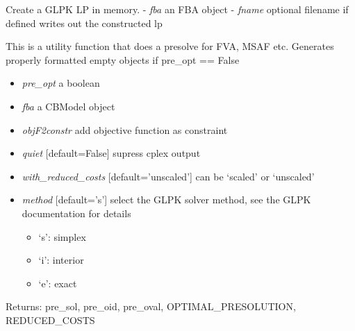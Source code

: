 \documentclass[a4paper,11pt,english]{sphinxmanual}
\begin{document}

\begin{fulllineitems}
\label{modules_doc:cbmpy.CBGLPK.glpk_constructLPfromFBA}
Create a GLPK LP in memory.
- \emph{fba} an FBA object
- \emph{fname} optional filename if defined writes out the constructed lp

\end{fulllineitems}


\begin{fulllineitems}
\label{modules_doc:cbmpy.CBGLPK.glpk_func_GetCPXandPresolve}
This is a utility function that does a presolve for FVA, MSAF etc. Generates properly formatted
empty objects if pre\_opt == False
\begin{itemize}
\item {} 
\emph{pre\_opt} a boolean

\item {} 
\emph{fba} a CBModel object

\item {} 
\emph{objF2constr} add objective function as constraint

\item {} 
\emph{quiet} {[}default=False{]} supress cplex output

\item {} 
\emph{with\_reduced\_costs} {[}default='unscaled'{]} can be `scaled' or `unscaled'

\item {} 
\emph{method} {[}default='s'{]} select the GLPK solver method, see the GLPK documentation for details
\begin{itemize}
\item {} 
`s': simplex

\item {} 
`i': interior

\item {} 
`e': exact

\end{itemize}

\end{itemize}

Returns: pre\_sol, pre\_oid, pre\_oval, OPTIMAL\_PRESOLUTION, REDUCED\_COSTS

\end{fulllineitems}
\end{document}
